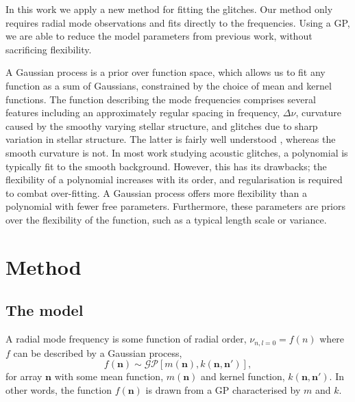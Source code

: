\documentclass[linenumbers,modern]{aastex631dm}
\begin{document}
In this work we apply a new method for fitting the glitches. Our method only
requires radial mode observations and fits directly to the frequencies. Using
a GP, we are able to reduce the model parameters from previous work, without
sacrificing flexibility. 

A Gaussian process is a prior over function space, which allows us to fit any
function as a sum of Gaussians, constrained by the choice of mean and kernel
functions. The function describing the mode frequencies comprises several
features including an approximately regular spacing in frequency,
\(\Delta\nu\), curvature caused by the smoothy varying stellar structure, and
glitches due to sharp variation in stellar structure. The latter is fairly well
understood \citep{Houdek:2007}, whereas the smooth curvature is not. In
most work studying acoustic glitches, a polynomial is typically fit
to the smooth background. However, this has its drawbacks; the flexibility
of a polynomial increases with its order, and regularisation is required to
combat over-fitting. A Gaussian process offers more flexibility than a
polynomial with fewer free parameters. Furthermore, these parameters are priors
over the flexibility of the function, such as a typical length scale or
variance.


\section{Method}\label{sec:method}


\subsection{The model}\label{sec:model}

A radial mode frequency is some function of radial order,
\(\nu_{n,l=0} = f(n)\) where \(f\) can be described by a Gaussian process,
%
\begin{equation}
    f(\bm n) \sim \mathcal{GP}\left[m(\bm n), k(\bm n, \bm n')\right],
\end{equation}
%
for array \(\bm n\) with some mean function, \(m(\bm n)\) and kernel function,
\(k(\bm n, \bm n')\). In other words, the function \(f(\bm n)\) is drawn from a
GP characterised by \(m\) and \(k\).
\end{document}

